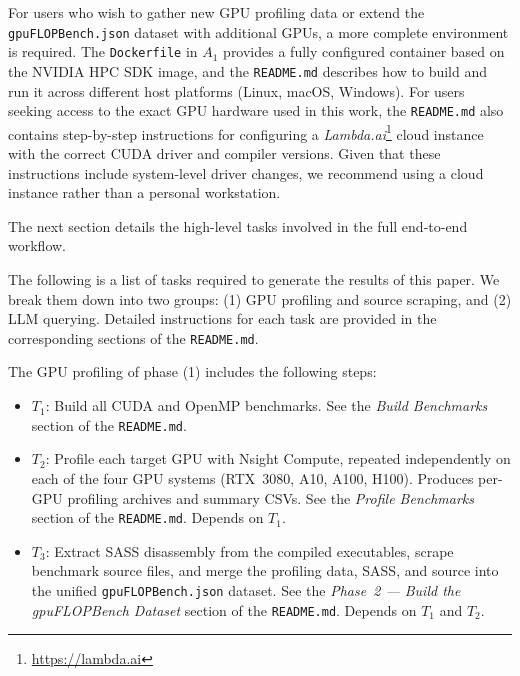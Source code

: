 For users who wish to gather new GPU profiling data or extend the \texttt{gpuFLOPBench.json} dataset with additional GPUs, a more complete environment is required.
The \texttt{Dockerfile} in $A_1$ provides a fully configured container based on the NVIDIA HPC SDK image, and the \texttt{README.md} describes how to build and run it across different host platforms (Linux, macOS, Windows).
For users seeking access to the exact GPU hardware used in this work, the \texttt{README.md} also contains step-by-step instructions for configuring a \textit{Lambda.ai}\footnote{\url{https://lambda.ai}} cloud instance with the correct CUDA driver and compiler versions.
Given that these instructions include system-level driver changes, we recommend using a cloud instance rather than a personal workstation.

The next section details the high-level tasks involved in the full end-to-end workflow.















\artcomp

The following is a list of tasks required to generate the results of this paper.
We break them down into two groups: (1) GPU profiling and source scraping, and (2) LLM querying.
Detailed instructions for each task are provided in the corresponding sections of the \texttt{README.md}.

The GPU profiling of phase (1) includes the following steps:

\begin{itemize}
    \item $T_1$: Build all \hecbench CUDA and OpenMP benchmarks.
    See the \textit{Build Benchmarks} section of the \texttt{README.md}.

    \item $T_2$: Profile each target GPU with Nsight Compute, repeated independently on each of the four GPU systems (RTX~3080, A10, A100, H100).
    Produces per-GPU profiling archives and summary CSVs.
    See the \textit{Profile Benchmarks} section of the \texttt{README.md}.
    Depends on $T_1$.

    \item $T_3$: Extract SASS disassembly from the compiled executables, scrape benchmark source files, and merge the profiling data, SASS, and source into the unified \texttt{gpuFLOPBench.json} dataset.
    See the \textit{Phase~2 --- Build the gpuFLOPBench Dataset} section of the \texttt{README.md}.
    Depends on $T_1$ and $T_2$.
\end{itemize}

